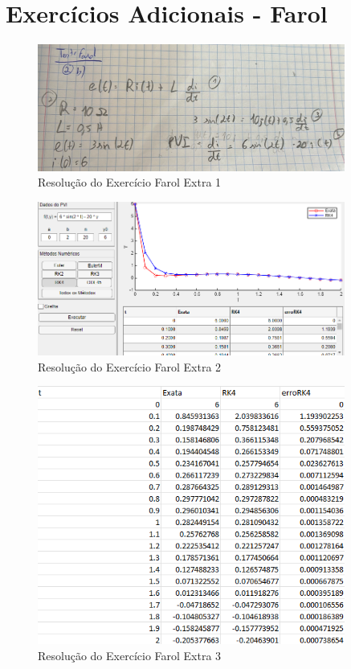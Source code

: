 
\section*{Exercícios Adicionais - Farol}

\begin{figure}[H]
    \centering
    \includegraphics[width=0.9\textwidth]{Fotos/3farol1}
    \caption{Resolução do Exercício Farol Extra 1}
    \label{fig:3farol1}
\end{figure}

\begin{figure}[H]
    \centering
    \includegraphics[width=0.9\textwidth]{Fotos/3farol2}
    \caption{Resolução do Exercício Farol Extra 2}
    \label{fig:3farol2}
\end{figure}

\begin{figure}[H]
    \centering
    \includegraphics[width=0.9\textwidth]{Fotos/3farol3}
    \caption{Resolução do Exercício Farol Extra 3}
    \label{fig:3farol3}
\end{figure}

